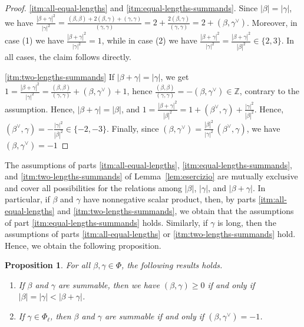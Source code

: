 \documentclass[10pt]{amsart}
\newtheorem{pro}[thm]{Proposition}
\theoremstyle{definition}
\theoremstyle{remark}
\newcommand\ganz{\mathbb Z}
\newcommand\be{\beta}
\newcommand\ga{\gamma}
\begin{document}
\begin{proof}
\ref{itm:all-equal-lengths} and \ref{itm:equal-lengths-summands}. 
Since $|\be|=|\ga|$, we have $\frac{|\be+\ga|^2}{ |\ga|^2}= \frac{(\be,\be)+2(\be,\ga)+(\ga,\ga)}{(\ga,\ga)}=2+\frac{2(\be,\ga)}{(\ga,\ga)}=2+(\be,\ga^\vee)$. 
Moreover, in case (1) we have $\frac{|\be+\ga|^2}{ |\ga|^2}=1$, while in case (2) we have $\frac{|\be+\ga|^2}{ |\ga|^2}=\frac{|\be+\ga|^2}{ |\be|^2}\in \{2, 3\}$. 
In all cases, the claim follows directly. 

\par
\ref{itm:two-lengths-summands} If $|\be+\ga|=|\ga|$, we get $1=\frac{|\be+\ga|^2}{ |\ga|^2}= \frac{(\be,\be)}{(\ga, \ga)}+(\be,\ga^\vee)+1$, hence $\frac{(\be,\be)}{(\ga, \ga)}=-(\be,\ga^\vee)\in \ganz$, contrary to the assumption.
Hence, $|\be+\ga|=|\be|$, and $1=\frac{|\be+\ga|^2}{ |\be|^2}= 1+(\be^\vee,\ga)+\frac{|\ga|^2}{ |\be|^2}$.
Hence, $(\be^\vee,\ga)=-\frac{|\ga|^2}{ |\be|^2}\in \{-2, -3\}$.
Finally, since $(\be,\ga^\vee)=\frac{ |\be|^2}{|\ga|^2}\,(\be^\vee,\ga)$, we have $(\be,\ga^\vee)=-1$
\end{proof}
\medskip

\par
The assumptions of parts \ref{itm:all-equal-lengths}, \ref{itm:equal-lengths-summands}, and \ref{itm:two-lengths-summands} of Lemma~\ref{lem:esercizio} are mutually exclusive and cover all possibilities for the relations among $|\be|$, $|\ga|$, and  $|\be+\ga|$.  
In particular, if $\be$ and $\ga$ have nonnegative scalar product, then, by parts \ref{itm:all-equal-lengths} and \ref{itm:two-lengths-summands}, we obtain that the assumptions of part \ref{itm:equal-lengths-summands} holds. 
Similarly, if $\ga$ is long, then the assumptions of parts \ref{itm:all-equal-lengths} or \ref{itm:two-lengths-summands} hold.
Hence, we obtain the following proposition. 

\begin{pro}\label{pro:summable-acute}
For all $\be, \ga\in \Phi$, the following results holds.
\begin{enumerate}
\item 
If $\be$ and $\ga$ are summable, then  we have 
$(\be, \ga)\geq 0$ if and only if $|\be|= | \ga|<|\be+\ga|$.
\label{itm:general}
\item
If $\ga\in \Phi_\ell$, then $\be$ and $\ga$ are summable if and only if $(\be, \ga^\vee)=-1$.
\label{itm:long}
\end{enumerate}
\end{pro}
\end{document}
